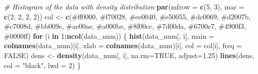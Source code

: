 \documentclass[
]{article}
\newenvironment{Shaded}{\begin{snugshade}}{\end{snugshade}}
\newcommand{\AttributeTok}[1]{\textcolor[rgb]{0.13,0.29,0.53}{#1}}
\newcommand{\CommentTok}[1]{\textcolor[rgb]{0.56,0.35,0.01}{\textit{#1}}}
\newcommand{\ConstantTok}[1]{\textcolor[rgb]{0.56,0.35,0.01}{#1}}
\newcommand{\ControlFlowTok}[1]{\textcolor[rgb]{0.13,0.29,0.53}{\textbf{#1}}}
\newcommand{\DecValTok}[1]{\textcolor[rgb]{0.00,0.00,0.81}{#1}}
\newcommand{\FloatTok}[1]{\textcolor[rgb]{0.00,0.00,0.81}{#1}}
\newcommand{\FunctionTok}[1]{\textcolor[rgb]{0.13,0.29,0.53}{\textbf{#1}}}
\newcommand{\NormalTok}[1]{#1}
\newcommand{\OtherTok}[1]{\textcolor[rgb]{0.56,0.35,0.01}{#1}}
\newcommand{\SpecialCharTok}[1]{\textcolor[rgb]{0.81,0.36,0.00}{\textbf{#1}}}
\newcommand{\StringTok}[1]{\textcolor[rgb]{0.31,0.60,0.02}{#1}}
\begin{document}
\begin{Shaded}
\begin{Highlighting}[]
\CommentTok{\# Histogram of the data with density distribution}
\FunctionTok{par}\NormalTok{(}\AttributeTok{mfrow =} \FunctionTok{c}\NormalTok{(}\DecValTok{5}\NormalTok{, }\DecValTok{3}\NormalTok{), }\AttributeTok{mar =} \FunctionTok{c}\NormalTok{(}\DecValTok{2}\NormalTok{, }\DecValTok{2}\NormalTok{, }\DecValTok{2}\NormalTok{, }\DecValTok{2}\NormalTok{))}
\NormalTok{col }\OtherTok{\textless{}{-}} \FunctionTok{c}\NormalTok{(}\StringTok{\textquotesingle{}\#ff0000\textquotesingle{}}\NormalTok{, }\StringTok{\textquotesingle{}\#f70028\textquotesingle{}}\NormalTok{, }\StringTok{\textquotesingle{}\#ee0040\textquotesingle{}}\NormalTok{, }\StringTok{\textquotesingle{}\#e50055\textquotesingle{}}\NormalTok{, }\StringTok{\textquotesingle{}\#dc0069\textquotesingle{}}\NormalTok{,}
         \StringTok{\textquotesingle{}\#d2007b\textquotesingle{}}\NormalTok{, }\StringTok{\textquotesingle{}\#c7008d\textquotesingle{}}\NormalTok{, }\StringTok{\textquotesingle{}\#bb009e\textquotesingle{}}\NormalTok{, }\StringTok{\textquotesingle{}\#ae00ae\textquotesingle{}}\NormalTok{, }\StringTok{\textquotesingle{}\#a000be\textquotesingle{}}\NormalTok{,}
         \StringTok{\textquotesingle{}\#8f00cc\textquotesingle{}}\NormalTok{, }\StringTok{\textquotesingle{}\#7d00da\textquotesingle{}}\NormalTok{, }\StringTok{\textquotesingle{}\#6700e7\textquotesingle{}}\NormalTok{, }\StringTok{\textquotesingle{}\#4900f3\textquotesingle{}}\NormalTok{, }\StringTok{\textquotesingle{}\#0000ff\textquotesingle{}}\NormalTok{)}
\ControlFlowTok{for}\NormalTok{ (i }\ControlFlowTok{in} \DecValTok{1}\SpecialCharTok{:}\FunctionTok{ncol}\NormalTok{(data\_num)) \{}
  \FunctionTok{hist}\NormalTok{(data\_num[, i], }\AttributeTok{main =} \FunctionTok{colnames}\NormalTok{(data\_num)[i],}
       \AttributeTok{xlab =} \FunctionTok{colnames}\NormalTok{(data\_num)[i], }\AttributeTok{col =}\NormalTok{ col[i], }\AttributeTok{freq =} \ConstantTok{FALSE}\NormalTok{)}
\NormalTok{  dens }\OtherTok{\textless{}{-}} \FunctionTok{density}\NormalTok{(data\_num[, i], }\AttributeTok{na.rm=}\ConstantTok{TRUE}\NormalTok{, }\AttributeTok{adjust=}\FloatTok{1.25}\NormalTok{)}
  \FunctionTok{lines}\NormalTok{(dens, }\AttributeTok{col =} \StringTok{"black"}\NormalTok{, }\AttributeTok{lwd =} \DecValTok{2}\NormalTok{)}
\NormalTok{\}}
\end{Highlighting}
\end{Shaded}
\end{document}
